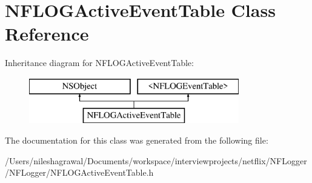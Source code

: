 \hypertarget{interface_n_f_l_o_g_active_event_table}{}\section{N\+F\+L\+O\+G\+Active\+Event\+Table Class Reference}
\label{interface_n_f_l_o_g_active_event_table}
Inheritance diagram for N\+F\+L\+O\+G\+Active\+Event\+Table\+:\begin{figure}[H]
\begin{center}
\leavevmode
\includegraphics[height=2.000000cm]{interface_n_f_l_o_g_active_event_table}
\end{center}
\end{figure}


The documentation for this class was generated from the following file\+:\begin{DoxyCompactItemize}
\item 
/\+Users/nileshagrawal/\+Documents/workspace/interviewprojects/netflix/\+N\+F\+Logger/\+N\+F\+Logger/N\+F\+L\+O\+G\+Active\+Event\+Table.\+h\end{DoxyCompactItemize}
